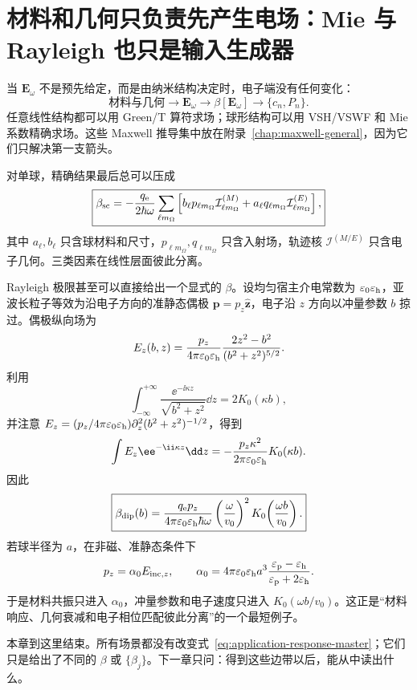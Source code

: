 \section{材料和几何只负责先产生电场：Mie 与 Rayleigh 也只是输入生成器}

当 \(\bm E_\omega\) 不是预先给定，而是由纳米结构决定时，电子端没有任何变化：
\begin{equation}
\boxed{
\text{材料与几何}
\longrightarrow \bm E_\omega
\longrightarrow \beta[\bm E_\omega]
\longrightarrow \{c_n,P_n\}.}
\label{eq:maxwell-interface-short}
\end{equation}
任意线性结构都可以用 Green/T 算符求场；球形结构可以用 VSH/VSWF 和 Mie 系数精确求场。这些 Maxwell 推导集中放在附录~\ref{chap:maxwell-general}，因为它们只解决第一支箭头。

对单球，精确结果最后总可以压成
\begin{equation}
\boxed{
\beta_{\rm sc}
=-\frac{q_{\rm e}}{2\hbar\omega}
\sum_{\ell m_\Omega}
\left[
 b_\ell p_{\ell m_\Omega}\mathcal I_{\ell m_\Omega}^{(M)}
+a_\ell q_{\ell m_\Omega}\mathcal I_{\ell m_\Omega}^{(E)}
\right],}
\label{eq:mie-beta-short}
\end{equation}
其中 \(a_\ell,b_\ell\) 只含球材料和尺寸，\(p_{\ell m_\Omega},q_{\ell m_\Omega}\) 只含入射场，轨迹核 \(\mathcal I^{(M/E)}\) 只含电子几何。三类因素在线性层面彼此分离。

Rayleigh 极限甚至可以直接给出一个显式的 \(\beta\)。设均匀宿主介电常数为 \(\varepsilon_0\varepsilon_{\rm h}\)，亚波长粒子等效为沿电子方向的准静态偶极 \(\bm p=p_z\hat{\bm z}\)，电子沿 \(z\) 方向以冲量参数 \(b\) 掠过。偶极纵向场为
\begin{equation}
E_z(b,z)
=\frac{p_z}{4\pi\varepsilon_0\varepsilon_{\rm h}}
\frac{2z^2-b^2}{(b^2+z^2)^{5/2}}.
\end{equation}
利用
\begin{equation}
\int_{-\infty}^{+\infty}\frac{\ee^{-\ii\kappa z}}{\sqrt{b^2+z^2}}\dd z
=2K_0(\kappa b),
\end{equation}
并注意 \(E_z=(p_z/4\pi\varepsilon_0\varepsilon_{\rm h})\partial_z^2(b^2+z^2)^{-1/2}\)，得到
\begin{equation}
\int E_z\ee^{-\ii\kappa z}\dd z
=-\frac{p_z\kappa^2}{2\pi\varepsilon_0\varepsilon_{\rm h}}K_0(\kappa b).
\end{equation}
因此
\begin{equation}
\boxed{
\beta_{\rm dip}(b)
=\frac{q_{\rm e}p_z}{4\pi\varepsilon_0\varepsilon_{\rm h}\hbar\omega}
\left(\frac{\omega}{v_0}\right)^2
K_0\!\left(\frac{\omega b}{v_0}\right).}
\label{eq:dipole-beta-K0}
\end{equation}
若球半径为 \(a\)，在非磁、准静态条件下
\begin{equation}
p_z=\alpha_0E_{{\rm inc},z},
\qquad
\alpha_0=4\pi\varepsilon_0\varepsilon_{\rm h}a^3
\frac{\varepsilon_{\rm p}-\varepsilon_{\rm h}}
{\varepsilon_{\rm p}+2\varepsilon_{\rm h}}.
\end{equation}
于是材料共振只进入 \(\alpha_0\)，冲量参数和电子速度只进入 \(K_0(\omega b/v_0)\)。这正是“材料响应、几何衰减和电子相位匹配彼此分离”的一个最短例子。

本章到这里结束。所有场景都没有改变式~\eqref{eq:application-response-master}；它们只是给出了不同的 \(\beta\) 或 \(\{\beta_j\}\)。下一章只问：得到这些边带以后，能从中读出什么。
